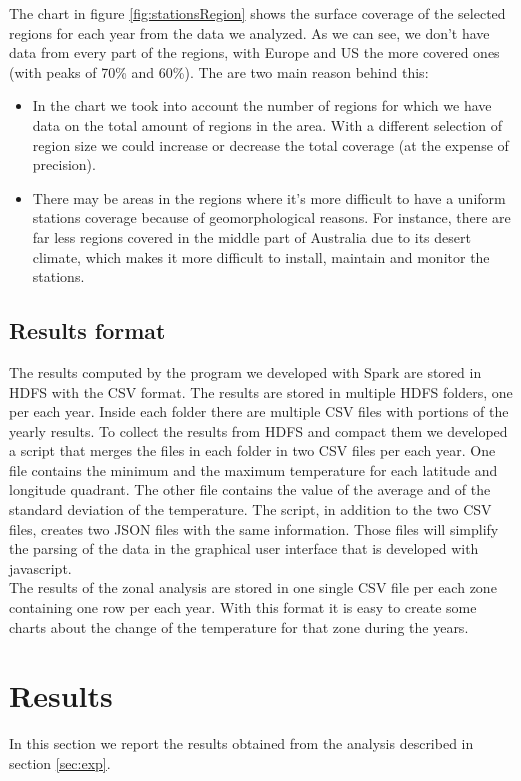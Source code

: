 \documentclass{vldb}
\begin{document}
The chart in figure \ref{fig:stationsRegion} shows the surface coverage of the selected regions for each year from the data we analyzed. As we can see, we don't have data from every part of the regions, with Europe and US the more covered ones (with peaks of 70\% and 60\%). The are two main reason behind this:
\begin{itemize}
    \item In the chart we took into account the number of regions for which we have data on the total amount of regions in the area. With a different selection of region size we could increase or decrease the total coverage (at the expense of precision).
    \item There may be areas in the regions where it's more difficult to have a uniform stations coverage because of geomorphological reasons. For instance, there are far less regions covered in the middle part of Australia due to its desert climate, which makes it more difficult to install, maintain and monitor the stations.
\end{itemize}


\subsection{Results format}
The results computed by the program we developed with Spark are stored in HDFS with the CSV format. The results are stored in multiple HDFS folders, one per each year. Inside each folder there are multiple CSV files with portions of the yearly results. To collect the results from HDFS and compact them we developed a script that merges the files in each folder in two CSV files per each year. One file contains the minimum and the maximum temperature for each latitude and longitude quadrant. The other file contains the value of the average and of the standard deviation of the temperature.
The script, in addition to the two CSV files, creates two JSON files with the same information. Those files will simplify the parsing of the data in the graphical user interface that is developed with javascript.
\\ The results of the zonal analysis are stored in one single CSV file per each zone containing one row per each year. With this format it is easy to create some charts about the change of the temperature for that zone during the years.



\FloatBarrier

\section{Results}
\label{sec:res}
In this section we report the results obtained from the analysis described in section \ref{sec:exp}.
\end{document}

